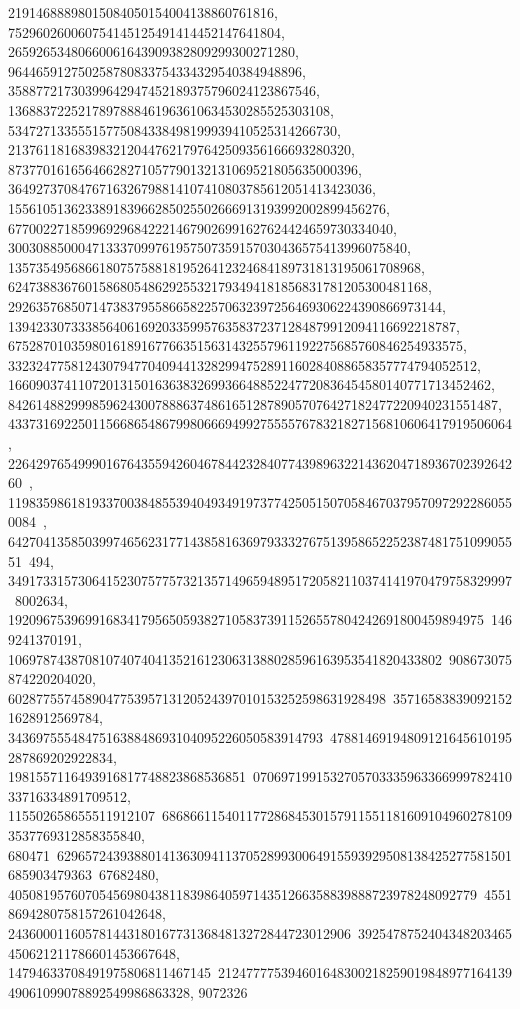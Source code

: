 {{{   21914688898015084050154004138860761816, 
   752960260060754145125491414452147641804, 
   26592653480660061643909382809299300271280, 
   964465912750258780833754334329540384948896, 
   35887721730399642947452189375796024123867546, 
   1368837225217897888461963610634530285525303108, 
   53472713355515775084338498199939410525314266730, 
   2137611816839832120447621797642509356166693280320, 
   87377016165646628271057790132131069521805635000396, 
   3649273708476716326798814107410803785612051413423036, 
   155610513623389183966285025502666913193992002899456276, 
   6770022718599692968422214679026991627624424659730334040, 
   300308850004713337099761957507359157030436575413996075840, 
   13573549568661807575881819526412324684189731813195061708968, 
   624738836760158680548629255321793494181856831781205300481168, 
   29263576850714738379558665822570632397256469306224390866973144, 
   1394233073338564061692033599576358372371284879912094116692218787, 
   67528701035980161891677663515631432557961192275685760846254933575, 
   3323247758124307947704094413282994752891160284088658357774794052512, 
   166090374110720131501636383269936648852247720836454580140771713452462, 
   8426148829998596243007888637486165128789057076427182477220940231551487, 
   433731692250115668654867998066694992755557678321827156810606417919506064, 
   22642976549990167643559426046784423284077439896322143620471893670239264260\
, 
   1198359861819337003848553940493491973774250515070584670379570972922860550084\
, 
   64270413585039974656231771438581636979333276751395865225238748175109905551\
494, 349173315730641523075775732135714965948951720582110374141970479758329997\
8002634, 19209675396991683417956505938271058373911526557804242691800459894975\
1469241370191, 10697874387081074074041352161230631388028596163953541820433802\
908673075874220204020, 602877557458904775395713120524397010153252598631928498\
357165838390921521628912569784, 343697555484751638848693104095226050583914793\
47881469194809121645610195287869202922834, 1981557116493916817748823868536851\
070697199153270570333596336699978241033716334891709512, 115502658655511912107\
686866115401177286845301579115511816091049602781093537769312858355840, 680471\
62965724393880141363094113705289930064915593929508138425277581501685903479363\
67682480, 4050819576070545698043811839864059714351266358839888723978248092779\
45518694280758157261042648, 2436000116057814431801677313684813272844723012906\
3925478752404348203465450621211786601453667648, 14794633708491975806811467145\
21247777539460164830021825901984897716413949061099078892549986863328, 9072326\
}}}
